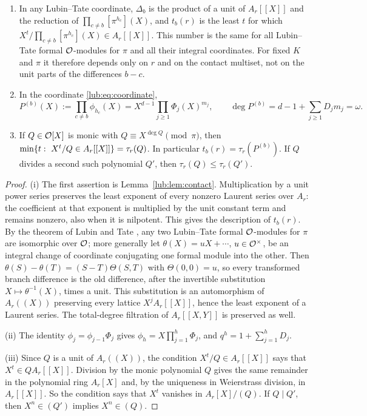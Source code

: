 \begin{lemma}\label{lub:lem:normal}
\begin{enumerate}[label=\textup{(\roman*)}]
\item In any Lubin--Tate coordinate, $\Delta_b$ is the product of a unit of $A_r[[X]]$ and
the reduction of $\prod_{c\ne b}[\pi^{h_c}](X)$, and $t_b(r)$ is the least $t$ for which
$X^t/\prod_{c\ne b}[\pi^{h_c}](X)\in A_r[[X]]$. This number is the same for all Lubin--Tate
formal $\mathcal{O}$-modules for $\pi$ and all their integral coordinates. For fixed $K$ and $\pi$
it therefore depends only on $r$ and on the contact multiset, not on the unit parts of the
differences $b-c$.
\item In the coordinate \eqref{lub:eq:coordinate},
\begin{equation}\label{lub:eq:denominator}
 P^{(b)}(X):=\prod_{c\ne b}\phi_{h_c}(X)=X^{d-1}\prod_{j\ge1}\Phi_j(X)^{m_j},
 \qquad \deg P^{(b)}=d-1+\sum_{j\ge1}D_jm_j=\omega .
\end{equation}
\item If $Q\in\mathcal{O}[X]$ is monic with $Q\equiv X^{\deg Q}\pmod\pi$, then
$\min\{t:\ X^t/Q\in A_r[[X]]\}=\tau_r(Q)$. In particular $t_b(r)=\tau_r(P^{(b)})$.
If $Q$ divides a second such polynomial $Q'$, then $\tau_r(Q)\le\tau_r(Q')$.
\end{enumerate}
\end{lemma}
\begin{proof}
(i) The first assertion is Lemma~\ref{lub:lem:contact}. Multiplication by a unit power series
preserves the least exponent of every nonzero Laurent series over $A_r$: the coefficient at
that exponent is multiplied by the unit constant term and remains nonzero, also when it is
nilpotent. This gives the description of $t_b(r)$. By the theorem of Lubin and Tate
\cite{LubinTate1965Formal}, any two Lubin--Tate formal $\mathcal{O}$-modules for $\pi$ are
isomorphic over $\mathcal{O}$; more generally let $\theta(X)=uX+\cdots$, $u\in\mathcal{O}^\times$, be an
integral change of coordinate conjugating one formal module into the other. Then
$\theta(S)-\theta(T)=(S-T)\Theta(S,T)$ with $\Theta(0,0)=u$, so every transformed branch
difference is the old difference, after the invertible substitution
$X\mapsto\theta^{-1}(X)$, times a unit. This substitution is an automorphism of $A_r((X))$
preserving every lattice $X^jA_r[[X]]$, hence the least exponent of a Laurent series. The
total-degree filtration of $A_r[[X,Y]]$ is preserved as well.

(ii) The identity $\phi_j=\phi_{j-1}\Phi_j$ gives $\phi_h=X\prod_{j=1}^h\Phi_j$, and
$q^h=1+\sum_{j=1}^hD_j$.

(iii) Since $Q$ is a unit of $A_r((X))$, the condition $X^t/Q\in A_r[[X]]$ says that
$X^t\in QA_r[[X]]$. Division by the monic polynomial $Q$ gives the same remainder in the
polynomial ring $A_r[X]$ and, by the uniqueness in Weierstrass division, in $A_r[[X]]$. So
the condition says that $X^t$ vanishes in $A_r[X]/(Q)$. If $Q\mid Q'$, then $X^n\in(Q')$
implies $X^n\in(Q)$.
\end{proof}

